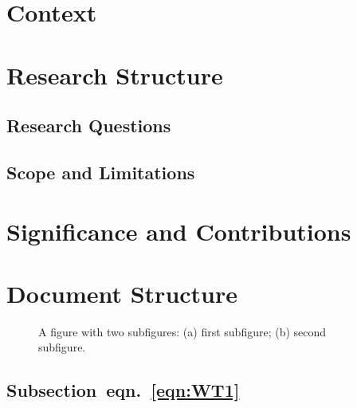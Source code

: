 \section[Context]{Context}

\section[Research Structure]{Research Structure}
\subsection[Research Questions]{Research Questions}
\subsection[Scope and Limitations]{Scope and Limitations}
\section[Significance and Contributions]{Significance and Contributions}
\section[Document Structure]{Document Structure}


\begin{figure}[t]
\begin{subfigure}[c]{0.495\textwidth}
%
\end{subfigure}
\begin{subfigure}[c]{0.495\textwidth}
%
%
\end{subfigure}%
\caption{A figure with two subfigures: (a) first subfigure; (b) second subfigure.\label{fig:4}}
\end{figure}


\subsection[Subsection~eqn.~(\ref*{eqn:WT1})]{Subsection~eqn.~\eqref{eqn:WT1}}

